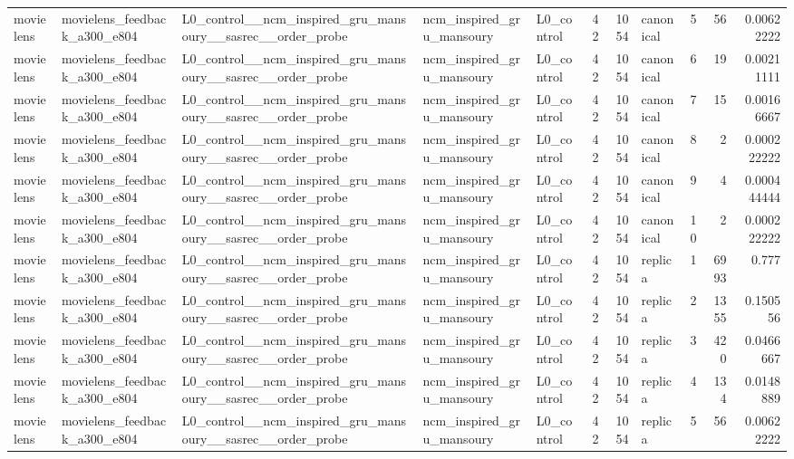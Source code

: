 \begin{table}[htbp!]
\begin{tabular}{lllllrrlrrr}
movielens & movielens\_feedback\_a300\_e804 & L0\_control\_\_ncm\_inspired\_gru\_mansoury\_\_sasrec\_\_order\_probe & ncm\_inspired\_gru\_mansoury & L0\_control & 42 & 1054 & canonical & 5 & 56 & 0.00622222 \\
movielens & movielens\_feedback\_a300\_e804 & L0\_control\_\_ncm\_inspired\_gru\_mansoury\_\_sasrec\_\_order\_probe & ncm\_inspired\_gru\_mansoury & L0\_control & 42 & 1054 & canonical & 6 & 19 & 0.00211111 \\
movielens & movielens\_feedback\_a300\_e804 & L0\_control\_\_ncm\_inspired\_gru\_mansoury\_\_sasrec\_\_order\_probe & ncm\_inspired\_gru\_mansoury & L0\_control & 42 & 1054 & canonical & 7 & 15 & 0.00166667 \\
movielens & movielens\_feedback\_a300\_e804 & L0\_control\_\_ncm\_inspired\_gru\_mansoury\_\_sasrec\_\_order\_probe & ncm\_inspired\_gru\_mansoury & L0\_control & 42 & 1054 & canonical & 8 & 2 & 0.000222222 \\
movielens & movielens\_feedback\_a300\_e804 & L0\_control\_\_ncm\_inspired\_gru\_mansoury\_\_sasrec\_\_order\_probe & ncm\_inspired\_gru\_mansoury & L0\_control & 42 & 1054 & canonical & 9 & 4 & 0.000444444 \\
movielens & movielens\_feedback\_a300\_e804 & L0\_control\_\_ncm\_inspired\_gru\_mansoury\_\_sasrec\_\_order\_probe & ncm\_inspired\_gru\_mansoury & L0\_control & 42 & 1054 & canonical & 10 & 2 & 0.000222222 \\
movielens & movielens\_feedback\_a300\_e804 & L0\_control\_\_ncm\_inspired\_gru\_mansoury\_\_sasrec\_\_order\_probe & ncm\_inspired\_gru\_mansoury & L0\_control & 42 & 1054 & replica & 1 & 6993 & 0.777 \\
movielens & movielens\_feedback\_a300\_e804 & L0\_control\_\_ncm\_inspired\_gru\_mansoury\_\_sasrec\_\_order\_probe & ncm\_inspired\_gru\_mansoury & L0\_control & 42 & 1054 & replica & 2 & 1355 & 0.150556 \\
movielens & movielens\_feedback\_a300\_e804 & L0\_control\_\_ncm\_inspired\_gru\_mansoury\_\_sasrec\_\_order\_probe & ncm\_inspired\_gru\_mansoury & L0\_control & 42 & 1054 & replica & 3 & 420 & 0.0466667 \\
movielens & movielens\_feedback\_a300\_e804 & L0\_control\_\_ncm\_inspired\_gru\_mansoury\_\_sasrec\_\_order\_probe & ncm\_inspired\_gru\_mansoury & L0\_control & 42 & 1054 & replica & 4 & 134 & 0.0148889 \\
movielens & movielens\_feedback\_a300\_e804 & L0\_control\_\_ncm\_inspired\_gru\_mansoury\_\_sasrec\_\_order\_probe & ncm\_inspired\_gru\_mansoury & L0\_control & 42 & 1054 & replica & 5 & 56 & 0.00622222 \\

\end{tabular}
\end{table}
